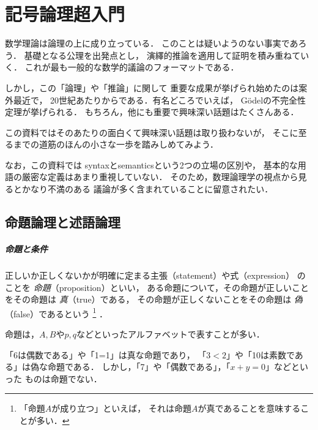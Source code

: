 \chapter{記号論理超入門}
\label{chp:sequent}
%

数学理論は論理の上に成り立っている．
このことは疑いようのない事実であろう．
基礎となる公理を出発点とし，
演繹的推論を適用して証明を積み重ねていく．
これが最も一般的な数学的議論のフォーマットである．

しかし，この「論理」や「推論」に関して
重要な成果が挙げられ始めたのは案外最近で，
20世紀あたりからである．有名どころでいえば，
G\"{o}delの不完全性定理が挙げられる．
もちろん，他にも重要で興味深い話題はたくさんある．

この資料ではそのあたりの面白くて興味深い話題は取り扱わないが，
そこに至るまでの道筋のほんの小さな一歩を踏みしめてみよう．

なお，この資料では
syntaxとsemanticsという2つの立場の区別や，
基本的な用語の厳密な定義はあまり重視していない．
そのため，数理論理学の視点から見るとかなり不満のある
議論が多く含まれていることに留意されたい．

%
%
%
%
 \section{命題論理と述語論理}
 \label{sec:ronri}
 \paragraph{命題と条件}
  正しいか正しくないかが明確に定まる主張（statement）や式（expression）
  のことを
  \emph{命題}（proposition）といい，
  ある命題について，その命題が正しいことをその命題は %
  \emph{真}（true）である，
  その命題が正しくないことをその命題は %
  \emph{偽}（false）であるという
  \footnote{「命題$A$が成り立つ」といえば，
  それは命題$A$が真であることを意味することが多い．}
  ．
  
  命題は，$A,  B$や$p,  q$などといったアルファベットで表すことが多い．

  \begin{ex}
    「6は偶数である」や「1=1」は真な命題であり，
    「$3<2$」や「10は素数である」は偽な命題である．
    しかし，「7」や「偶数である」，「$x+y=0$」などといった
    ものは命題でない．
  \end{ex}
  

